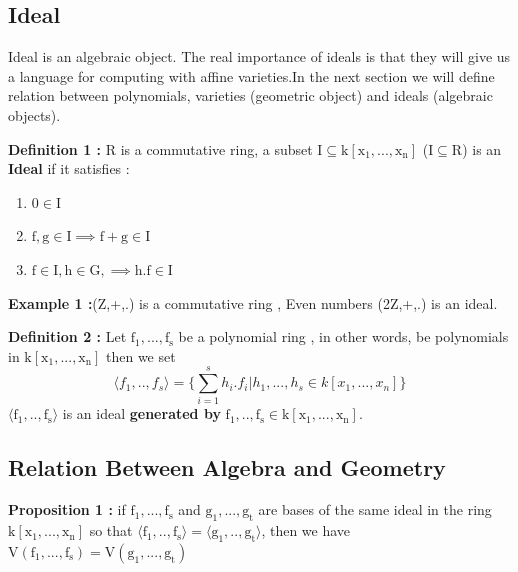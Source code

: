 \documentclass[11pt]{article}
\begin{document}
\subsection{Ideal}
Ideal is an algebraic object. The real importance of ideals is that they will give us a language for computing with affine varieties.In the next section we will define relation between polynomials, varieties (geometric object) and ideals (algebraic objects).\newline

\textbf{Definition 1 :}\newline
R is a commutative ring, a subset $\mathrm{ I \subseteq k[x_1,...,x_n] }$ ($\mathrm{ I \subseteq R }$) is an \textbf{Ideal} if it satisfies :
\begin{enumerate}
\item $\mathrm{0 \in I}$ 
\item $\mathrm{f,g \in I \implies f+g \in I}$ 
\item $\mathrm{f \in I, h \in G,\implies h.f \in I  }$
\end{enumerate}

\textbf{Example 1 :}\newline  (Z,+,.) is a commutative ring , Even numbers (2Z,+,.) is an ideal.\newline


\textbf{Definition 2 :}\newline
Let $\mathrm{ f_1,...,f_s }$ be a polynomial ring , in other words, be polynomials in  $\mathrm{ k[x_1,...,x_n] }$  then we set 
\begin{equation}
  \langle f_1,..,f_s \rangle=\{ \sum_{i=1}^{s}{h_i.f_i}| h_1,...,h_s \in k[x_1,...,x_n]\}
\end{equation}
$\mathrm{ \langle f_1,..,f_s \rangle  }$ is an ideal \textbf{generated by} $\mathrm{f_1,..,f_s \in k[x_1,...,x_n]}$. \newline

 
\subsection{Relation Between Algebra and Geometry}

\textbf{Proposition 1 :}\newline
if $\mathrm{ f_1,...,f_s }$ and $\mathrm{ g_1,...,g_t }$ are bases of the same ideal in the ring $\mathrm{k[x_1,...,x_n] }$ so that $\mathrm{ \langle f_1,..,f_s \rangle = \langle g_1,..,g_t \rangle }$, then we have  $\mathrm{V(f_1,...,f_s)=V(g_1,...,g_t) }$ \newline
 
\end{document}
